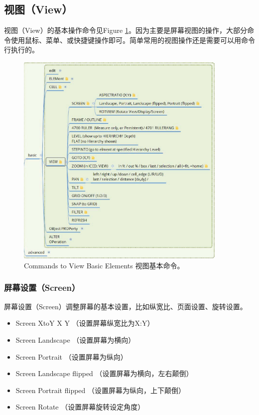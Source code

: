 \subsection{视图（View）} \label{SectCmdView}
视图（View）的基本操作命令见Figure \ref{FigCmdView}。因为主要是屏幕视图的操作，大部分命令使用鼠标、菜单、或快捷键操作即可。简单常用的视图操作还是需要可以用命令行执行的。
\begin{figure}[htb!p] %
	\centering
	\includegraphics[width=4in]{./Layout/FigsCmd/CmdBasicView.eps}
	\caption{Commands to View Basic Elements 视图基本命令。}
	\label{FigCmdView}
\end{figure}
\subsubsection{屏幕设置（Screen）} \label{SectCmdViewScreen}
屏幕设置（Screen）调整屏幕的基本设置，比如纵宽比、页面设置、旋转设置。
\begin{itemize}
	\item Screen XtoY X Y  （设置屏幕纵宽比为X:Y）
	\item Screen Landscape （设置屏幕为横向）
	\item Screen Portrait  （设置屏幕为纵向）
	\item Screen Landscape flipped （设置屏幕为横向，左右颠倒）
	\item Screen Portrait  flipped （设置屏幕为纵向，上下颠倒）
	\item Screen Rotate    （设置屏幕旋转设定角度）
\end{itemize}

